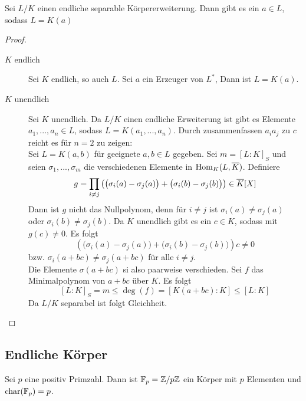 	\begin{theorem}\label{satz:primElem}
		Sei $L/K$ einen endliche separable Körpererweiterung. Dann gibt es ein $a\in L$, sodass $L=K(a)$
	\end{theorem}
	\begin{proof}
		\begin{description}
			\item[$K$ endlich] Sei $K$ endlich, so auch $L$. Sei $a$ ein Erzeuger von $L^*$, Dann ist $L=K(a)$.
			\item[$K$ unendlich] Sei $K$ unendlich. Da $L/K$ einen endliche Erweiterung ist gibt es Elemente $a_1,...,a_n\in L$, sodass $L=K(a_1,...,a_n)$. Durch zusammenfassen $a_ia_j$ zu $c$ reicht es für $n=2$ zu zeigen:\\
			Sei $L=K(a,b)$ für geeignete $a,b\in L$ gegeben. Sei $m=[L:K]_S$ und seien $\sigma_1,...,\sigma_m$ die verschiedenen Elemente in $\operatorname{Hom}_K(L,\overline{K})$. Definiere
			\[g=\prod_{i\neq j}\left(\big(\sigma_i(a)-\sigma_j(a)\big)+\big(\sigma_i(b)-\sigma_j(b)\big)\right)\in \overline{K}[X]\]
			Dann ist $g$ nicht das Nullpolynom, denn für $i\neq j$ ist $\sigma_i(a)\neq \sigma_j(a)$ oder $\sigma_i(b)\neq \sigma_j(b)$. Da $K$ unendlich gibt es ein $c\in K$, sodass mit $g(c)\neq 0$. Es folgt
			\[\left(\big(\sigma_i(a)-\sigma_j(a)\big)+\big(\sigma_i(b)-\sigma_j(b)\big)\right)c\neq 0\]
			bzw. $\sigma_{i}(a+bc)\neq \sigma_j(a+bc)$ für alle $i\neq j$.\\
			Die Elemente $\sigma(a+bc)$ si also paarweise verschieden. Sei $f$  das Minimalpolynom von $a+bc$ über $K$. Es folgt
			\[[L:K]_S=m\leq \deg(f)=[K(a+bc):K]\leq [L:K]\]
			Da $L/K$ separabel ist folgt Gleichheit.
		\end{description}
	
	\end{proof}




	\subsection{Endliche Körper}
	\begin{definition}
		Sei $p$ eine positiv Primzahl. Dann ist $\mathbb{F}_p=\mathbb{Z}/p\mathbb{Z}$ ein Körper mit $p$ Elementen und $\operatorname{char}(\mathbb{F}_p)=p$.
	\end{definition}


